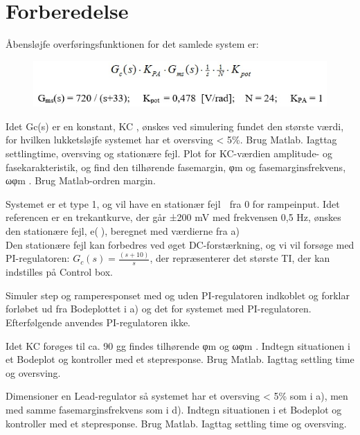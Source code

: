 \documentclass[]{report}
\begin{document}
\section{Forberedelse}
Åbensløjfe overføringsfunktionen for det samlede system er:\\
\begin{figure}[h]
	\centering
	\includegraphics[width=0.8\linewidth]{graphics/openloop_tf}
	\label{fig:openlooptf}
\end{figure}

\begin{enumerate*}[label={\alph*)}]
	\item Idet Gc(s) er en konstant, KC , ønskes ved simulering fundet den største værdi, for hvilken lukketsløjfe systemet har et oversving < 5\%. Brug Matlab. Iagttag settlingtime, oversving og stationære fejl. Plot for KC-værdien amplitude- og fasekarakteristik, og find den tilhørende fasemargin, φm og fasemarginsfrekvens, ωφm . Brug Matlab-ordren margin.\\	
	\newline \item Systemet er et type 1, og vil have en stationær fejl  fra 0 for rampeinput. 
	Idet referencen er en trekantkurve, der går ±200 mV med frekvensen  0,5 Hz,  ønskes den stationære fejl, e(), beregnet med værdierne fra a)\\
	\newline Den stationære fejl kan forbedres ved øget DC-forstærkning, og vi vil forsøge med PI-regulatoren: $G_{c}(s) = \frac{(s+10)}{s}$, der repræsenterer det største TI, der kan indstilles på Control box. \\
	\item Simuler step og ramperesponset med og uden PI-regulatoren indkoblet og forklar forløbet ud fra Bodeplottet i a) og det for systemet med PI-regulatoren.\\
	\newline Efterfølgende anvendes PI-regulatoren ikke.\\
	\newline \item Idet KC forøges til ca. 90 gg findes tilhørende φm og ωφm . Indtegn situationen i et Bodeplot og kontroller med et stepresponse. Brug Matlab. Iagttag settling time og oversving.\\
	\newline \item Dimensioner en Lead-regulator så systemet har et oversving < 5\% som i a), men med samme fasemarginsfrekvens som i d). Indtegn situationen i et Bodeplot og kontroller med et stepresponse. Brug Matlab. Iagttag settling time og oversving.\\
\end{enumerate*}
\end{document}
